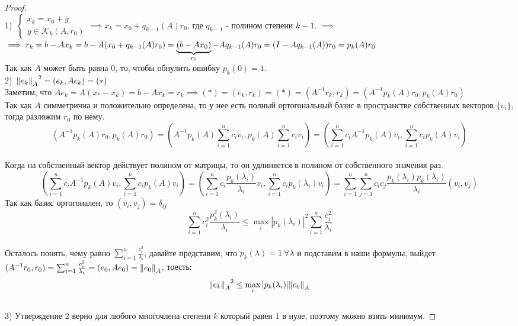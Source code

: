 \begin{proof}
	\hphantom{a}\\
	1)\ $\begin{cases}
		x_k = x_0 + y \\
		y \in \mathcal{K}_k(A, r_0)
	\end{cases} \implies x_k = x_0 + q_{k-1}(A)r_0$, где $q_{k-1}$ - полином степени $k-1$. $\implies$ \\
	$\implies r_k = b - Ax_k = b - A(x_0 + q_{k-1}(A)r_0) = \underbrace{(b - Ax_0)}_{\mathclap{r_0}} - Aq_{k-1}(A)r_0 = (I - Aq_{k-1}(A))r_0 = p_k(A)r_0$ \\
	Так как $A$ может быть равна $0$, то, чтобы обнулить ошибку $p_k(0) = 1$. \\
	2)\ $\norm[A]{e_k}^2 = (e_k, Ae_k) = (*)$ \\
	Заметим, что $Ae_k = A(x_*-x_k) = b - Ax_k = r_k \implies (*) = (e_k, r_k) = (*) = (A^{-1}r_k, r_k) = (A^{-1}p_k(A)r_0, p_k(A)r_0)$ \\
	Так как $A$ симметрична и положительно определена, то у нее есть полный ортогональный базис в пространстве собственных векторов $\{v_i\}$, тогда разложим $r_0$ по нему. \\
	$$(A^{-1}p_k(A)r_0, p_k(A)r_0) = \left(A^{-1}p_k(A)\sum^n_{i=1}c_i v_i, p_k(A)\sum^n_{i=1}c_i v_i\right) = \left(\sum^n_{i=1}c_i A^{-1}p_k(A) v_i, \sum^n_{i=1}c_i p_k(A)v_i\right)$$ \\
	Когда на собственный вектор действует полином от матрицы, то он удлиняется в полином от собственного значения раз. \\
	$$\left(\sum^n_{i=1}c_i A^{-1}p_k(A) v_i, \sum^n_{i=1}c_i p_k(A)v_i\right) = \left(\sum^n_{i=1}c_i \frac{p_k(\lambda_i)}{\lambda_i} v_i, \sum^n_{i=1}c_i p_k(\lambda_i)v_i\right) = \sum^n_{i=1}\sum^n_{j=1}c_ic_j \frac{p_k(\lambda_i)p_k(\lambda_i)}{\lambda_i}(v_i, v_j)$$
	Так как базис ортогонален, то $(v_i, v_j) = \delta_{ij}$ \\
	$$\sum^n_{i=1}c_i^2 \frac{p^2_k(\lambda_i)}{\lambda_i} \le \max_i |p_k(\lambda_i)|^2 \sum^n_{i=1}\frac{c_i^2}{\lambda_i} $$ \\
	Осталось понять, чему равно $\sum^n_{i=1}\frac{c_i^2}{\lambda_i}$, давайте представим, что $p_k(\lambda) = 1\ \forall \lambda$ и подставим в наши формулы, выйдет $(A^{-1}r_0, r_0) = \sum^n_{i=1}\frac{c_i^2}{\lambda_i} = (e_0, Ae_0) = \norm[A]{e_0}$, тоесть:
	$$\norm[A]{e_k}^2 \le \max_i |p_k(\lambda_i)|\norm[A]{e_0}$$ \\
	3) Утверждение 2 верно для любого многочлена степени $k$ который равен 1 в нуле, поэтому можно взять минимум.
\end{proof}

